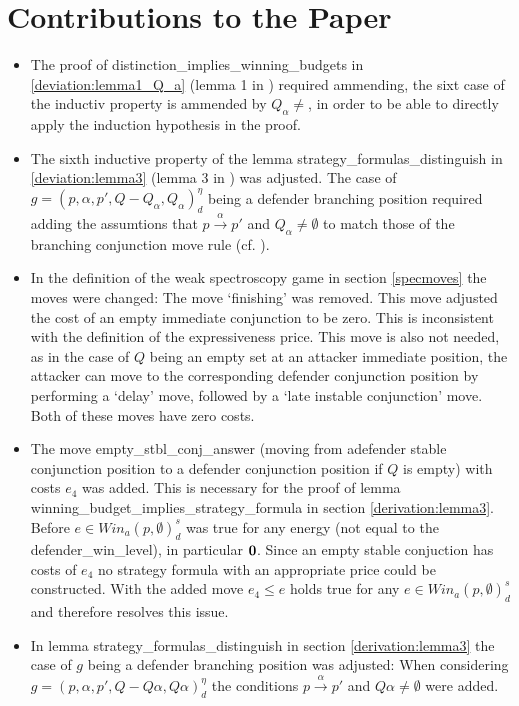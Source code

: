 \section{Contributions to the Paper}
\begin{itemize}
\item The proof of distinction\_implies\_winning\_budgets in \ref{deviation:lemma1_Q_a} 
(lemma 1 in \cite{bisping2023lineartimebranchingtime}) required ammending, the sixt case
of the inductiv property is ammended by $Q_\alpha \neq {}$, in order to be able to directly
apply the induction hypothesis in the proof.

\item The sixth inductive property of the lemma strategy\_formulas\_distinguish in \ref{deviation:lemma3} 
(lemma 3 in \cite{bisping2023lineartimebranchingtime}) was adjusted.
The case of $g=(p,\alpha ,p', Q- Q_\alpha, Q_\alpha)_d^\eta$ being a defender branching position
required adding the assumtions that $p \overset{\alpha}{\longrightarrow} p'$ and $Q_\alpha \neq \emptyset$
to match those of the branching conjunction move rule (cf. \cite[p. 13]{bisping2023lineartimebranchingtime}). 

\item In the definition of the weak spectroscopy game in section \ref{specmoves} the moves were changed: 
The move `finishing' was removed. This move adjusted the cost of an empty immediate conjunction to be zero.
This is inconsistent with the definition of the expressiveness price. This move is also not needed, as in the case of $Q$ being an empty set at an attacker immediate position, the attacker can move to the corresponding
defender conjunction position by performing a `delay' move, followed by a `late instable conjunction' move. Both of these moves have zero costs.

\item The move empty\_stbl\_conj\_answer (moving from adefender stable conjunction position to a defender conjunction
position if $Q$ is empty) with costs $e_4$ was added. This is necessary for the proof of lemma 
winning\_budget\_implies\_strategy\_formula in section \ref{derivation:lemma3}. Before 
$e \in Win_a (p, \emptyset)_d^s $ was true for any energy (not equal to the defender\_win\_level), in particular $\bold{0}$. 
Since an empty stable conjuction has costs of $e_4$ no strategy formula with an appropriate price could be constructed. 
With the added move $e_4 \leq e $ holds true for any $e \in Win_a (p, \emptyset)_d^s $ and therefore resolves this issue.

\item In lemma strategy\_formulas\_distinguish in section \ref{derivation:lemma3} the case of $g$ being a defender branching position was adjusted: 
When considering $g=(p,\alpha ,p', Q- Q \alpha, Q \alpha)_d^\eta$ the conditions $p \overset{\alpha}{\longrightarrow} p'$ and $Q \alpha \neq \emptyset$ were added. 
\end{itemize}
